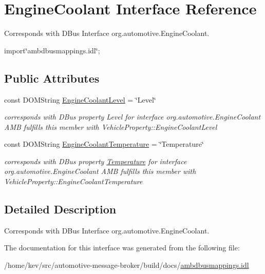 \hypertarget{interfaceEngineCoolant}{\section{Engine\+Coolant Interface Reference}
\label{interfaceEngineCoolant}
}


Corresponds with D\+Bus Interface org.\+automotive.\+Engine\+Coolant.  




{\ttfamily import\char`\"{}ambdbusmappings.\+idl\char`\"{};}

\subsection*{Public Attributes}
\begin{DoxyCompactItemize}
\item 
\hypertarget{interfaceEngineCoolant_a7245fb937d72b4799fbe6379252f1fda}{const D\+O\+M\+String \hyperlink{interfaceEngineCoolant_a7245fb937d72b4799fbe6379252f1fda}{Engine\+Coolant\+Level} = \char`\"{}Level\char`\"{}}\label{interfaceEngineCoolant_a7245fb937d72b4799fbe6379252f1fda}

\begin{DoxyCompactList}\small\item\em corresponds with D\+Bus property Level for interface org.\+automotive.\+Engine\+Coolant A\+M\+B fulfills this member with Vehicle\+Property\+::\+Engine\+Coolant\+Level \end{DoxyCompactList}\item 
\hypertarget{interfaceEngineCoolant_a561d51436c678300a5c433ea947d489a}{const D\+O\+M\+String \hyperlink{interfaceEngineCoolant_a561d51436c678300a5c433ea947d489a}{Engine\+Coolant\+Temperature} = \char`\"{}Temperature\char`\"{}}\label{interfaceEngineCoolant_a561d51436c678300a5c433ea947d489a}

\begin{DoxyCompactList}\small\item\em corresponds with D\+Bus property \hyperlink{interfaceTemperature}{Temperature} for interface org.\+automotive.\+Engine\+Coolant A\+M\+B fulfills this member with Vehicle\+Property\+::\+Engine\+Coolant\+Temperature \end{DoxyCompactList}\end{DoxyCompactItemize}


\subsection{Detailed Description}
Corresponds with D\+Bus Interface org.\+automotive.\+Engine\+Coolant. 

The documentation for this interface was generated from the following file\+:\begin{DoxyCompactItemize}
\item 
/home/kev/src/automotive-\/message-\/broker/build/docs/\hyperlink{ambdbusmappings_8idl}{ambdbusmappings.\+idl}\end{DoxyCompactItemize}
